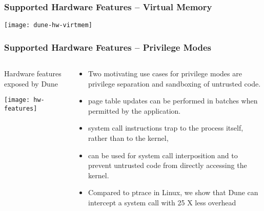 \begin{frame}[plain]
	\frametitle{ Supported Hardware Features -- Virtual Memory}
	
	\centering
	
	
	\texttt{[image: dune-hw-virtmem]}

	
\end{frame}
\begin{frame}[plain]
	\frametitle{Supported Hardware Features -- Privilege Modes}
	
	
	
	\begin{columns}
		
		\begin{column}{.4\textwidth}
			\centering
			Hardware features exposed by Dune
			
			\texttt{[image: hw-features]}
			
		\end{column}
		
		\begin{column}{.6\textwidth}
			
			
			\begin{itemize}
				\item  Two motivating use cases for
				privilege modes are privilege separation and sandboxing
				of untrusted code.
				\item  page table updates can be performed in batches when permitted by the application. 
				\item system
				call instructions trap to the process itself, rather than to
				the kernel,
				\item can be used for system call interposition and to prevent untrusted code from directly accessing	the kernel.
				\item Compared to ptrace in Linux, we show that
				Dune can intercept a system call with 25 X less overhead
				
			\end{itemize}					
			
		\end{column}
		
		
	\end{columns}
	
	
\end{frame}



